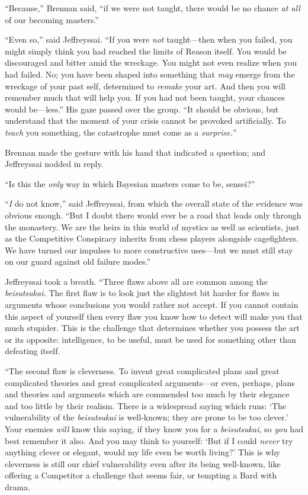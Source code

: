 {
 ``Because,'' Brennan said,
``if we were not taught, there would be no chance
\textit{at all} of our becoming masters.''}

{
 ``Even so,'' said Jeffreyssai.
``If you were \textit{not} taught---then when you
failed, you might simply think you had reached the limits of Reason
itself. You would be discouraged and bitter amid the wreckage. You
might not even realize when you had failed. No; you have been shaped
into something that \textit{may} emerge from the wreckage of your past
self, determined to \textit{remake} your art. And then you will
remember much that will help you. If you had not been taught, your
chances would be---less.'' His gaze passed over the
group. ``It should be obvious, but understand that the
moment of your crisis cannot be provoked artificially. To
\textit{teach} you something, the catastrophe must come as a
\textit{surprise.}''}

{
 Brennan made the gesture with his hand that indicated a question;
and Jeffreyssai nodded in reply.}

{
 ``Is this the \textit{only} way in which Bayesian
masters come to be, sensei?''}

{
 ``\textit{I} do not know,''
said Jeffreyssai, from which the overall state of the evidence was
obvious enough. ``But I doubt there would ever be a
road that leads only through the monastery. We are the heirs in this
world of mystics as well as scientists, just as the Competitive
Conspiracy inherits from chess players alongside cagefighters. We have
turned our impulses to more constructive uses---but we must still stay
on our guard against old failure modes.''}

{
 Jeffreyssai took a breath. ``Three flaws above
all are common among the \textit{beisutsukai.} The first flaw is to
look just the slightest bit harder for flaws in arguments whose
conclusions you would rather not accept. If you cannot contain this
aspect of yourself then every flaw you know how to detect will make you
that much stupider. This is the challenge that determines whether you
possess the art or its opposite: intelligence, to be useful, must be
used for something other than defeating itself.}

{
 ``The second flaw is cleverness. To invent great
complicated plans and great complicated theories and great complicated
arguments---or even, perhaps, plans and theories and arguments which
are commended too much by their elegance and too little by their
realism. There is a widespread saying which runs: `The
vulnerability of the \textit{beisutsukai} is well-known; they are prone
to be too clever.' Your enemies \textit{will} know this
saying, if they know you for a \textit{beisutsukai}, so \textit{you}
had best remember it also. And you may think to yourself:
`But if I could \textit{never} try anything clever or
elegant, would my life even be worth living?' This is
why cleverness is still our chief vulnerability even after its being
well-known, like offering a Competitor a challenge that seems fair, or
tempting a Bard with drama.}

